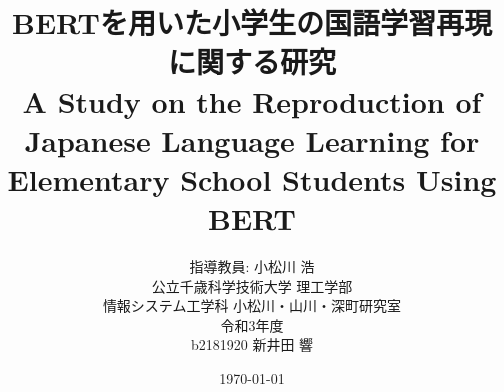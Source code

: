 \documentclass[12pt, a4paper]{ujreport} %
\begin{document}
\title{BERTを用いた小学生の国語学習再現に関する研究\\
A Study on the Reproduction of Japanese Language Learning for Elementary School Students Using BERT}
\author{指導教員: 小松川 浩\\
公立千歳科学技術大学 理工学部\\
情報システム工学科 小松川・山川・深町研究室\\
令和3年度\\
b2181920 新井田 響}
\date{\today}
\maketitle

\tableofcontents
\thispagestyle{empty}


\end{document}
